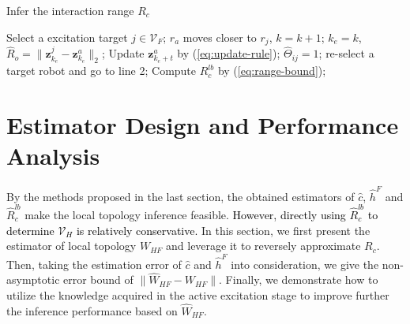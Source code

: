 \documentclass[12pt,journal,draftclsnofoot,onecolumn]{IEEEtran}
\let \sss=\scriptscriptstyle
\begin{document}
\begin{algorithm}[t]
    \caption{Infer the interaction range $R_c$}
    \label{algo:infer-range}
    \begin{algorithmic}[1]
    \STATE Select a excitation target $j\in\mathcal{V}_{\sss F}$;
    {
       \STATE $r_a$ moves closer to $r_j$, $k=k+1$;
    }
	\ENDWHILE
	\STATE $k_e=k$, $\hat{R}_o =\| {\mathbf z}_{k_e}^{j} - {\mathbf z}_{k_e}^{a} \|_2$;
    {
    	\STATE Update ${\mathbf z}_{k_e +t}^{a}$ by (\ref{eq:update-rule});
    }
    \ENDFOR
	\FOR {all $i\in\mathcal{V}_{\sss F}\backslash\{j\}$}
	{
		{
			\STATE $\hat{\Theta}_{ij}=1$;
		}
	  	\ENDIF
    }
	\ENDFOR
	{
		\STATE re-select a target robot and go to line 2;
	}
  	\ENDIF
	\STATE Compute $R_c^{lb} $ by (\ref{eq:range-bound});
    \end{algorithmic}
\end{algorithm}







\section{Estimator Design and Performance Analysis}\label{sec:inference-estimation}

By the methods proposed in the last section, the obtained estimators of $\hat c$, $\hat h^{F}$ and $\hat R_c^{lb}$ make the local topology inference feasible. 
\textcolor{black}{However, directly using $\hat R_c^{lb}$ to determine $\mathcal{V}_{\sss H}$ is relatively conservative.}  
In this section, we first present the estimator of local topology $W_{\sss HF}$ and leverage it to reversely approximate $R_c$. 
Then, taking the estimation error of $\hat c$ and $\hat h^{F}$ into consideration, we give the non-asymptotic error bound of $\| \hat{W}_{\sss HF} - W_{\sss HF}  \|$. 
Finally, we demonstrate how to utilize the knowledge acquired in the active excitation stage to improve further the inference performance based on $\hat{W}_{\sss HF}$. 
\end{document}
